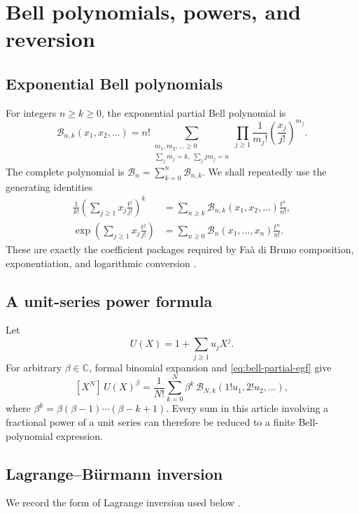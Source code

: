 \documentclass[11pt,a4paper,oneside,openany]{book}
\theoremstyle{definition}
\theoremstyle{remark}
\newcommand{\C}{\mathbb C}
\newcommand{\Coeff}[3]{[ #1^{#2}]\,#3}
\newcommand{\Bell}[1]{\mathcal B_{#1}}
\newcommand{\pBell}[2]{\mathcal B_{#1,#2}}
\newcommand{\falling}[2]{#1^{\underline{#2}}}
\begin{document}
\chapter{Bell polynomials, powers, and reversion}
\label{ch:calculus}

\section{Exponential Bell polynomials}
For integers $n\ge k\ge0$, the exponential partial Bell polynomial is
\begin{equation}
 \pBell nk(x_1,x_2,\ldots)
 =n!\!\sum_{\substack{m_1,m_2,\ldots\ge0\\
              \sum_jm_j=k,\ \sum_jjm_j=n}}
   \prod_{j\ge1}\frac1{m_j!}\left(\frac{x_j}{j!}\right)^{m_j}.
 \label{eq:partial-bell}
\end{equation}
The complete polynomial is
$\Bell n=\sum_{k=0}^n\pBell nk$.  We shall repeatedly use the generating identities
\begin{align}
 \frac1{k!}\left(\sum_{j\ge1}x_j\frac{t^j}{j!}\right)^k
 &=\sum_{n\ge k}\pBell nk(x_1,x_2,\ldots)\frac{t^n}{n!},
 \label{eq:bell-partial-egf}\\
 \exp\!\left(\sum_{j\ge1}x_j\frac{t^j}{j!}\right)
 &=\sum_{n\ge0}\Bell n(x_1,\ldots,x_n)\frac{t^n}{n!}.
 \label{eq:bell-complete-egf}
\end{align}
These are exactly the coefficient packages required by Fa\`a di Bruno composition,
exponentiation, and logarithmic conversion \cite{Comtet1974,ReshetnikovCCC}.

\section{A unit-series power formula}
Let
\[
 U(X)=1+\sum_{j\ge1}u_jX^j.
\]
For arbitrary $\beta\in\C$, formal binomial expansion and
\cref{eq:bell-partial-egf} give
\begin{equation}
 \boxed{
 \Coeff XN{U(X)^\beta}
 =\frac1{N!}\sum_{k=0}^N\falling\beta k\,
   \pBell Nk(1!u_1,2!u_2,\ldots),}
 \label{eq:unit-power-bell}
\end{equation}
where $\falling\beta k=\beta(\beta-1)\cdots(\beta-k+1)$.
Every sum in this article involving a fractional power of a unit series can
therefore be reduced to a finite Bell-polynomial expression.

\section{Lagrange--B\"urmann inversion}
We record the form of Lagrange inversion used below
\cite{Comtet1974,FlajoletSedgewick2009,ReshetnikovCCC}.
\end{document}
